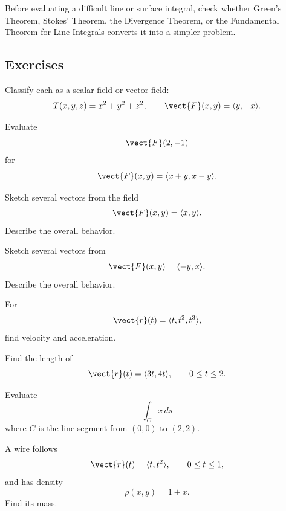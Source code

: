 Before evaluating a difficult line or surface integral, check whether Green's
Theorem, Stokes' Theorem, the Divergence Theorem, or the Fundamental Theorem
for Line Integrals converts it into a simpler problem.

\subsection{Exercises}
\label{subsec:vector-calculus-exercises}

\begin{exercise}[1]
Classify each as a scalar field or vector field:
\[ T(x,y,z)=x^2+y^2+z^2,\qquad
\vect{F}(x,y)=\langle y,-x\rangle. \]
\end{exercise}

\begin{exercise}[1]
Evaluate
\[ \vect{F}(2,-1) \]
for
\[ \vect{F}(x,y)=\langle x+y,x-y\rangle. \]
\end{exercise}

\begin{exercise}[2]
Sketch several vectors from the field
\[ \vect{F}(x,y)=\langle x,y\rangle. \]
Describe the overall behavior.
\end{exercise}

\begin{exercise}[2]
Sketch several vectors from
\[ \vect{F}(x,y)=\langle-y,x\rangle. \]
Describe the overall behavior.
\end{exercise}

\begin{exercise}[1]
For
\[ \vect{r}(t)=\langle t,t^2,t^3\rangle, \]
find velocity and acceleration.
\end{exercise}

\begin{exercise}[2]
Find the length of
\[ \vect{r}(t)=\langle3t,4t\rangle,\qquad0\leq t\leq2. \]
\end{exercise}

\begin{exercise}[2]
Evaluate
\[ \int_Cx\,ds \]
where \(C\) is the line segment from \((0,0)\) to \((2,2)\).
\end{exercise}

\begin{exercise}[2]
A wire follows
\[ \vect{r}(t)=\langle t,t^2\rangle,\qquad0\leq t\leq1, \]
and has density
\[ \rho(x,y)=1+x. \]
Find its mass.
\end{exercise}

